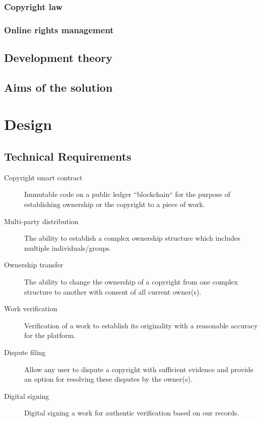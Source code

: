 \documentclass[12pt]{article}
\begin{document}
\subsubsection{Copyright law}
\subsubsection{Online rights management}

\subsection{Development theory}

\subsection{Aims of the solution}

\section{Design}

\subsection{Technical Requirements}

\begin{description}
	\item[Copyright smart contract] Immutable code on a public ledger “blockchain“ for the purpose of establishing ownership or the copyright to a piece of work.
	\item[Multi-party distribution] The ability to establish a complex ownership structure which includes multiple individuals/groups.
	\item[Ownership transfer] The ability to change the ownership of a copyright from one complex structure to another with consent of all current owner(s).
	\item[Work verification] Verification of a work to establish its originality with a reasonable accuracy for the platform.
	\item[Dispute filing] Allow any user to dispute a copyright with sufficient evidence and provide an option for resolving these disputes by the owner(s).
	\item[Digital signing] Digital signing a work for authentic verification based on our records.
\end{description}
\end{document}
